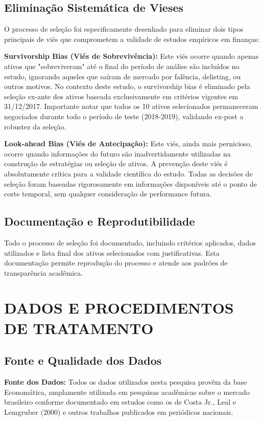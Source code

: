 \subsection{Eliminação Sistemática de Vieses}

O processo de seleção foi especificamente desenhado para eliminar dois tipos principais de viés que comprometem a validade de estudos empíricos em finanças:

\textbf{Survivorship Bias (Viés de Sobrevivência):} Este viés ocorre quando apenas ativos que "sobreviveram" até o final do período de análise são incluídos no estudo, ignorando aqueles que saíram de mercado por falência, delisting, ou outros motivos. No contexto deste estudo, o survivorship bias é eliminado pela seleção ex-ante dos ativos baseada exclusivamente em critérios vigentes em 31/12/2017. Importante notar que todos os 10 ativos selecionados permaneceram negociados durante todo o período de teste (2018-2019), validando ex-post a robustez da seleção.

\textbf{Look-ahead Bias (Viés de Antecipação):} Este viés, ainda mais pernicioso, ocorre quando informações do futuro são inadvertidamente utilizadas na construção de estratégias ou seleção de ativos. A prevenção deste viés é absolutamente crítica para a validade científica do estudo. Todas as decisões de seleção foram baseadas rigorosamente em informações disponíveis até o ponto de corte temporal, sem qualquer consideração de performance futura.

\subsection{Documentação e Reprodutibilidade}

Todo o processo de seleção foi documentado, incluindo critérios aplicados, dados utilizados e lista final dos ativos selecionados com justificativas. Esta documentação permite reprodução do processo e atende aos padrões de transparência acadêmica.

\section{DADOS E PROCEDIMENTOS DE TRATAMENTO}

\subsection{Fonte e Qualidade dos Dados}

\textbf{Fonte dos Dados:} Todos os dados utilizados nesta pesquisa provêm da base Economática, amplamente utilizada em pesquisas acadêmicas sobre o mercado brasileiro conforme documentado em estudos como os de Costa Jr., Leal e Lemgruber (2000) e outros trabalhos publicados em periódicos nacionais.

